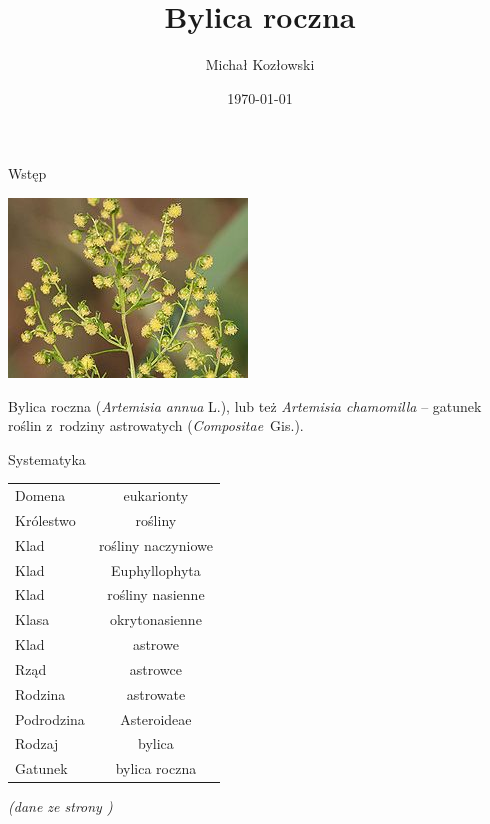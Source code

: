 \documentclass{beamer}
\title{Bylica roczna}
\author{Michał Kozłowski}
\date{\today}
\institute{UWM}
\begin{document}
\frame{\titlepage}
	
\begin{frame}{Wstęp}
	\begin{center}
	\includegraphics[scale = 0.35]{grafika/ilustracja.jpeg}
	\end{center}
	Bylica roczna (\textit{Artemisia annua} L.), lub też \textit{Artemisia chamomilla}\cite{site2} – gatunek roślin z~rodziny astrowatych (\textit{Compositae}~Gis.).
\end{frame}

\begin{frame}{Systematyka}
	\centering
	\begin{table}
		\begin{tabular}{lc}
		Domena&eukarionty\\ \pause
		Królestwo&rośliny\\ \pause
		Klad&rośliny naczyniowe\\ \pause
		Klad&Euphyllophyta\\ \pause
		Klad&rośliny nasienne\\ \pause
		Klasa&okrytonasienne\\ \pause
		Klad&astrowe\\ \pause
		Rząd&astrowce\\ \pause
		Rodzina&astrowate\\ \pause
		Podrodzina&Asteroideae\\ \pause
		Rodzaj&bylica\\ \pause
		Gatunek&bylica roczna\\
		\end{tabular}
	\end{table}
	\textit{ (dane ze strony \cite{site1}) }
\end{frame}
\end{document}
